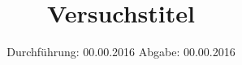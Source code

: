 


\subject{Versuchsprotokoll}
\title{Versuchstitel}
\date{
  Durchführung: 00.00.2016
  \hspace{3em}
  Abgabe: 00.00.2016
}




\maketitle
\thispagestyle{empty}







\printbibliography


